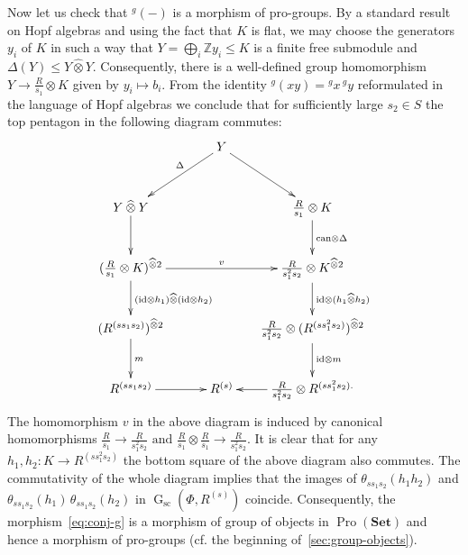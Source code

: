 \documentclass[oneside, 11pt]{amsart}
\numberwithin{equation}{section}
\theoremstyle{definition}
\theoremstyle{remark}
\DeclareMathOperator\GG{G}
\DeclareMathOperator{\Pro}{Pro}
\newcommand{\Set}{\mathbf{Set}}
\newcommand{\otimeshat}{\mathbin{\widehat{\otimes}}}
\newcommand{\up}[2]{{^{#1}\!{#2}}}
\begin{document}
Now let us check that \(\up g{(-)}\) is a morphism of pro-groups.
By a standard result on Hopf algebras and using the fact that $K$ is flat, we may choose the generators $y_i$ of \(K\) in such a way that $Y = \bigoplus_i \mathbb Z y_i \leq K$ is a finite free submodule and $\Delta(Y) \leq Y \otimeshat Y$. Consequently, there is a well-defined group homomorphism $Y \to \frac R{s_1} \otimes K$ given by $y_i \mapsto b_i$. From the identity $\up g{(xy)} = \up gx\, \up gy$ reformulated in the language of Hopf algebras we conclude that for sufficiently large $s_2 \in S$ the top pentagon in the following diagram commutes:
\begin{equation}\label{eq:house} \begin{aligned} \xymatrix@R=48pt@C=72pt@!0{
 & Y \ar[dr] \ar[dl]_(0.4){\Delta} & \\
Y \otimeshat Y \ar[d] &  & \frac R{s_1} \otimes K \ar[d]^{\mathrm{can} \otimes \Delta} \\
(\frac R{s_1} \otimes K)^{\otimeshat 2} \ar[rr]^{v} \ar[d]^{(\mathrm{id} \otimes h_1) \otimeshat (\mathrm{id} \otimes h_2)} && \frac R{s_1^2 s_2} \otimes K^{\otimeshat 2} \ar[d]^{\mathrm{id} \otimes (h_1 \otimeshat h_2)} \\
(R^{(ss_1s_2)})^{\otimeshat 2} \ar[d]^{m} && \frac R{s_1^2 s_2} \otimes (R^{(ss_1^2 s_2)})^{\otimeshat 2} \ar[d]^{\mathrm{id}\otimes m} \\
R^{(ss_1s_2)} \ar[r] & R^{(s)} & \frac R{s_1^2 s_2} \otimes R^{(ss_1^2 s_2).} \ar[l]
}\end{aligned}\end{equation}
The homomorphism $v$ in the above diagram is induced by canonical homomorphisms $\tfrac R {s_1} \to \tfrac R {s_1^2s_2}\text{ and }\tfrac{R} {s_1} \otimes \tfrac R{s_1} \to \tfrac R{s_1^2s_2}.$
It is clear that for any $h_1, h_2 \colon K \to R^{(ss_1^2 s_2)}$ the bottom square of the above diagram also commutes.
The commutativity of the whole diagram implies that the images of $\theta_{ss_1s_2}(h_1h_2)$ and $\theta_{ss_1s_2}(h_1)\, \theta_{ss_1s_2}(h_2)$ in $\GG_\mathrm{sc}(\Phi, R^{(s)})$ coincide. Consequently, the morphism~\eqref{eq:conj-g} is a morphism of group of objects in $\Pro(\Set)$ and hence a morphism of pro-groups (cf. the beginning of~\cref{sec:group-objects}).
\end{document}
